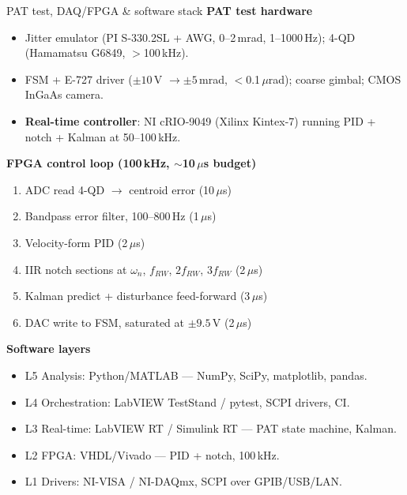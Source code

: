 \documentclass{KAIST-slide}
\newcommand{\si}{\item[\textcolor{islcorange}{\ding{167}}]}    %
\newcommand{\key}[1]{\textcolor{islcblue}{\textbf{#1}}}        %
\begin{document}
\begin{frame}[allowframebreaks=1.2]{PAT test, DAQ/FPGA \& software stack}
    \textbf{PAT test hardware}
    \begin{itemize}\footnotesize
        \si Jitter emulator (PI S-330.2SL + AWG, 0--2\,mrad, 1--1000\,Hz); 4-QD (Hamamatsu G6849, $>$100\,kHz).
        \si FSM + E-727 driver ($\pm10$\,V $\to\pm5$\,mrad, $<$0.1\,$\mu$rad); coarse gimbal; CMOS InGaAs camera.
        \si \key{Real-time controller}: NI cRIO-9049 (Xilinx Kintex-7) running PID + notch + Kalman at 50--100\,kHz.
    \end{itemize}
    \framebreak
    \textbf{FPGA control loop (100\,kHz, $\sim$10\,$\mu$s budget)}
    \begin{enumerate}[label=\arabic*.]\scriptsize
        \item ADC read 4-QD $\to$ centroid error (10\,$\mu$s)
        \item Bandpass error filter, 100--800\,Hz (1\,$\mu$s)
        \item Velocity-form PID (2\,$\mu$s)
        \item IIR notch sections at $\omega_n$, $f_{RW}$, $2f_{RW}$, $3f_{RW}$ (2\,$\mu$s)
        \item Kalman predict + disturbance feed-forward (3\,$\mu$s)
        \item DAC write to FSM, saturated at $\pm9.5$\,V (2\,$\mu$s)
    \end{enumerate}
    \framebreak
    \textbf{Software layers}
    \begin{itemize}\footnotesize
        \si L5 Analysis: Python/MATLAB --- NumPy, SciPy, matplotlib, pandas.
        \si L4 Orchestration: LabVIEW TestStand / pytest, SCPI drivers, CI.
        \si L3 Real-time: LabVIEW RT / Simulink RT --- PAT state machine, Kalman.
        \si L2 FPGA: VHDL/Vivado --- PID + notch, 100\,kHz.
        \si L1 Drivers: NI-VISA / NI-DAQmx, SCPI over GPIB/USB/LAN.
    \end{itemize}
\end{frame}
\end{document}
